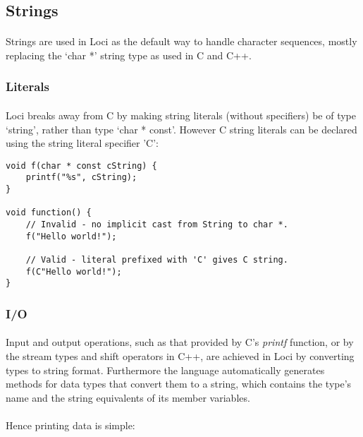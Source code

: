 \documentclass[12pt,twoside,notitlepage]{report}
\begin{document}
\subsection{Strings}

\paragraph{}
Strings are used in Loci as the default way to handle character sequences, mostly replacing the `char *' string type as used in C and C++.

\subsubsection{Literals}

\paragraph{}
Loci breaks away from C by making string literals (without specifiers) be of type `string', rather than type `char * const'. However C string literals can be declared using the string literal specifier 'C':

\begin{lstlisting}
void f(char * const cString) {
	printf("%s", cString);
}

void function() {
	// Invalid - no implicit cast from String to char *.
	f("Hello world!");
	
	// Valid - literal prefixed with 'C' gives C string.
	f(C"Hello world!");
}
\end{lstlisting}

\subsubsection{I/O}

\paragraph{}
Input and output operations, such as that provided by C's \emph{printf} function, or by the stream types and shift operators in C++, are achieved in Loci by converting types to string format. Furthermore the language automatically generates methods for data types that convert them to a string, which contains the type's name and the string equivalents of its member variables.

\paragraph{}
Hence printing data is simple:
\end{document}
